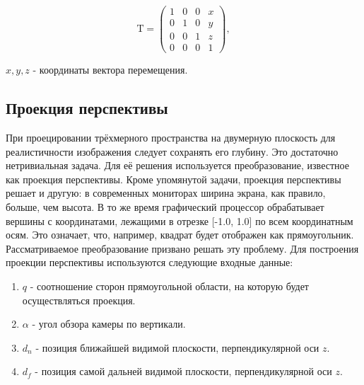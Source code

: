 \begin{equation}
\mathrm{T} = 
  \begin{pmatrix}
    1 & 0  & 0 & x\\
    0 & 1 & 0 & y\\
    0 & 0 & 1 & z\\
      0 & 0 & 0 & 1
  \end{pmatrix},
\end{equation}
\begin{eqrem}
\begin{math} x, y, z \end{math} - координаты вектора перемещения.
\end{eqrem}

\subsection{Проекция перспективы}
При проецировании трёхмерного пространства на двумерную плоскость для реалистичности изображения следует сохранять его глубину.
Это достаточно нетривиальная задача. Для её решения используется преобразование, известное как проекция перспективы. 
Кроме упомянутой задачи, проекция перспективы решает и другую: в современных мониторах ширина экрана, как правило, больше, чем высота. 
В то же время графический процессор обрабатывает вершины с координатами, лежащими в отрезке [-1.0, 1.0] по всем координатным осям. 
Это означает, что, например, квадрат будет отображен как прямоугольник. Рассматриваемое преобразование призвано решать эту проблему.
Для построения проекции перспективы используются следующие входные данные:

\begin{enumerate}
\item \begin{math}q\end{math} - соотношение сторон прямоугольной области, на которую будет осуществляться проекция.
\item \begin{math}\alpha\end{math} - угол обзора камеры по вертикали.
\item \begin{math}d_n\end{math} - позиция ближайшей видимой плоскости, перпендикулярной оси \begin{math}z\end{math}.
\item \begin{math}d_f\end{math} - позиция самой дальней видимой плоскости, перпендикулярной оси \begin{math}z\end{math}.
\end{enumerate}

